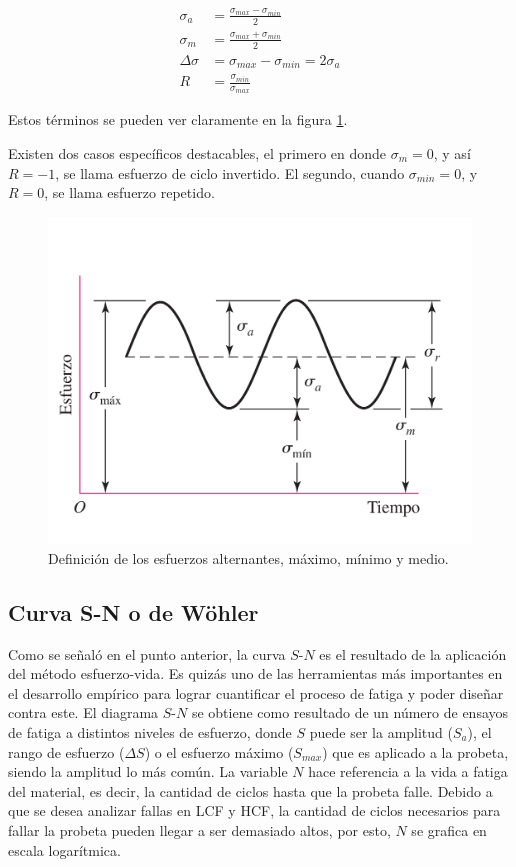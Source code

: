 \begin{align}
	\sigma_a &= \frac{\sigma_{max} - \sigma_{min}}{2} \label{eq:s_a} \\
	\sigma_m &= \frac{\sigma_{max} + \sigma_{min}}{2} \label{eq:s_m} \\
	\Delta \sigma &= \sigma_{max} - \sigma_{min} = 2\sigma_a  \label{eq:ds} \\
	R &= \frac{\sigma_{min}}{\sigma_{max}} \label{eq:r_s} 
\end{align}

Estos términos se pueden ver claramente en la figura \ref{fig:defesf_fat}.

\newpage

Existen dos casos específicos destacables, el primero en donde $\sigma_m = 0$, y así $R=-1$, se llama esfuerzo de ciclo invertido. El segundo, cuando $\sigma_{min}=0$, y $R=0$, se llama esfuerzo repetido.

\begin{figure}[h]
\centering
\includegraphics[width=0.6\linewidth, trim={0cm 1cm 0cm 2cm},clip]{Imagenes/defesf_fat.pdf}
\caption{Definición de los esfuerzos alternantes, máximo, mínimo y medio. \cite{budynas2008shigley}}
\label{fig:defesf_fat}
\end{figure}

\subsection{Curva S-N o de Wöhler}
Como se señaló en el punto anterior, la curva $S$-$N$ es el resultado de la aplicación del método esfuerzo-vida. Es quizás uno de las herramientas más importantes en el desarrollo empírico para lograr cuantificar el proceso de fatiga y poder diseñar contra este. El diagrama $S$-$N$ se obtiene como resultado de un número de ensayos de fatiga a distintos niveles de esfuerzo, donde $S$ puede ser la amplitud ($S_a$), el rango de esfuerzo ($\Delta S$) o el esfuerzo máximo ($S_{max}$) que es aplicado a la probeta, siendo la amplitud lo más común. La variable $N$ hace referencia a la vida a fatiga del material, es decir, la cantidad de ciclos hasta que la probeta falle. Debido a que se desea analizar fallas en LCF y HCF, la cantidad de ciclos necesarios para fallar la probeta pueden llegar a ser demasiado altos, por esto, $N$ se grafica en escala logarítmica.

